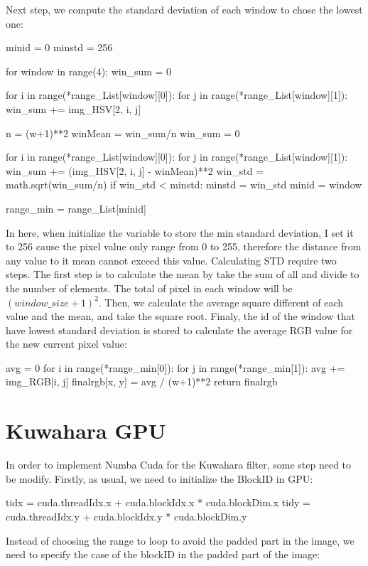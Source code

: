 \documentclass{article}
\begin{document}
Next step, we compute the standard deviation of each window to chose the lowest one:
\begin{python}
            minid = 0
            minstd = 256

            for window in range(4):
                win_sum = 0

                for i in range(*range_List[window][0]):
                    for j in range(*range_List[window][1]):
                        win_sum += img_HSV[2, i, j]

                n = (w+1)**2
                winMean = win_sum/n
                win_sum = 0

                for i in range(*range_List[window][0]):
                    for j in range(*range_List[window][1]):
                        win_sum += (img_HSV[2, i, j] - winMean)**2 
                win_std = math.sqrt(win_sum/n)
                if win_std < minstd:
                    minstd = win_std
                    minid = window

            range_min = range_List[minid]
\end{python}

In here, when initialize the variable to store the min standard deviation, I set it to 256 cause the pixel value only range from 0 to 255, therefore the distance from any value to it mean cannot exceed this value. Calculating STD require two steps. The first step is to calculate the mean by take the sum of all and divide to the number of elements. The total of pixel in each window will be $(window\_size+1)^2 $. Then, we calculate the average square different of each value and the mean, and take the square root. Finaly, the id of the window that have lowest standard deviation is stored to calculate the average RGB value for the new current pixel value:

\begin{python}
                avg = 0
            for i in range(*range_min[0]):
                for j in range(*range_min[1]):
                    avg += img_RGB[i, j]
            finalrgb[x, y] = avg / (w+1)**2
    return finalrgb
\end{python}


\section{Kuwahara GPU}
In order to implement Numba Cuda for the Kuwahara filter, some step need to be modify.
Firstly, as usual, we need to initialize the BlockID in GPU:
\begin{python}
    tidx = cuda.threadIdx.x + cuda.blockIdx.x * cuda.blockDim.x
    tidy = cuda.threadIdx.y + cuda.blockIdx.y * cuda.blockDim.y
\end{python}
Instead of choosing the range to loop to avoid the padded part in the image, we need to specify the case of the blockID in the padded part of the image:
\end{document}
